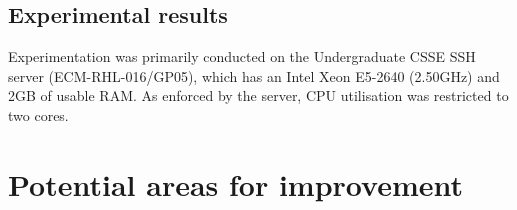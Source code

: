 \documentclass[a4paper, 11pt, titlepage]{report}
\begin{document}
\section{Experimental results}
Experimentation was primarily conducted on the Undergraduate CSSE SSH server (ECM-RHL-016/GP05), which has an Intel Xeon E5-2640 (2.50GHz) and 2GB of usable RAM. As enforced by the server, CPU utilisation was restricted to two cores.



\chapter{Potential areas for improvement}

\renewcommand{\bibname}{References}

  
\end{document}
